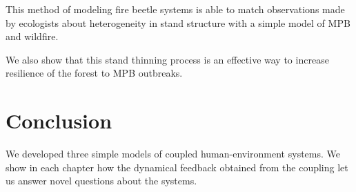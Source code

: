 \documentclass{article}
\begin{document}
This method of modeling fire beetle systems is able to match observations made by ecologists about heterogeneity in stand structure with a simple model of MPB and wildfire. 

We also show that this stand thinning process is an effective way to increase resilience of the forest to MPB outbreaks. 
  
\section{Conclusion} 

We developed three simple models of coupled human-environment systems. We show in each chapter how the dynamical feedback obtained from the coupling let us answer novel questions about the systems.
\section{}
\end{document}
